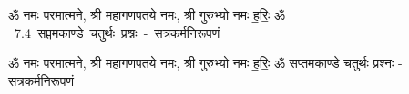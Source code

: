 \documentclass[17pt]{extarticle}
\begin{document}
\begin{titlepage}
    \begin{center}
 
\begin{sanskrit}
    { \Large
    ॐ नमः परमात्मने, श्री महागणपतये नमः, श्री गुरुभ्यो नमः
ह॒रिः॒ ॐ 
    }
    \\
    \vspace{2.5cm}
    \mbox{ \Huge
    7.4      सप्तमकाण्डे चतुर्थः प्रश्नः - सत्रकर्मनिरूपणं   }
\end{sanskrit}
\end{center}

\end{titlepage}
\tableofcontents

ॐ नमः परमात्मने, श्री महागणपतये नमः, श्री गुरुभ्यो नमः
ह॒रिः॒ ॐ       सप्तमकाण्डे चतुर्थः प्रश्नः - सत्रकर्मनिरूपणं \newline

\end{document}
